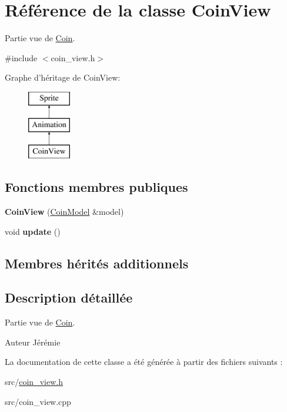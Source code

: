 \hypertarget{class_coin_view}{\section{Référence de la classe Coin\+View}
\label{class_coin_view}
}


Partie vue de \hyperlink{class_coin}{Coin}.  




{\ttfamily \#include $<$coin\+\_\+view.\+h$>$}

Graphe d'héritage de Coin\+View\+:\begin{figure}[H]
\begin{center}
\leavevmode
\includegraphics[height=3.000000cm]{class_coin_view}
\end{center}
\end{figure}
\subsection*{Fonctions membres publiques}
\begin{DoxyCompactItemize}
\item 
\hypertarget{class_coin_view_aedc333b50d848dedb4128fb09a543d33}{{\bfseries Coin\+View} (\hyperlink{class_coin_model}{Coin\+Model} \&model)}\label{class_coin_view_aedc333b50d848dedb4128fb09a543d33}

\item 
\hypertarget{class_coin_view_a2315293fc87a8466cf5b859a122d59b5}{void {\bfseries update} ()}\label{class_coin_view_a2315293fc87a8466cf5b859a122d59b5}

\end{DoxyCompactItemize}
\subsection*{Membres hérités additionnels}


\subsection{Description détaillée}
Partie vue de \hyperlink{class_coin}{Coin}. 

\begin{DoxyAuthor}{Auteur}
Jérémie 
\end{DoxyAuthor}


La documentation de cette classe a été générée à partir des fichiers suivants \+:\begin{DoxyCompactItemize}
\item 
src/\hyperlink{coin__view_8h}{coin\+\_\+view.\+h}\item 
src/coin\+\_\+view.\+cpp\end{DoxyCompactItemize}
